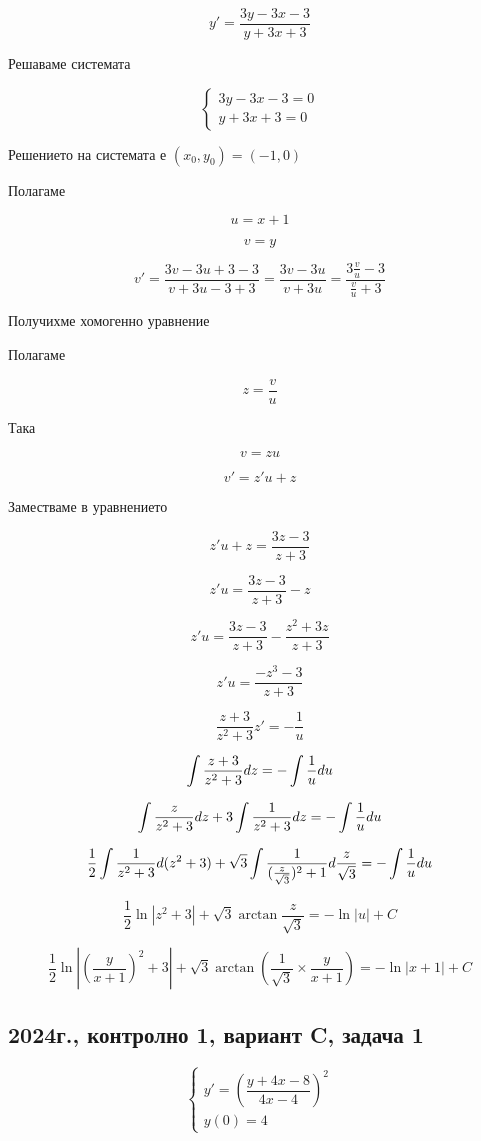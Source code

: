 \documentclass{scrartcl}
\begin{document}
$$y' = \dfrac{3y-3x-3}{y+3x+3}$$

Решаваме системата

$$
\begin{cases}
3y-3x-3=0\\
y+3x+3 = 0
\end{cases}
$$

Решението на системата е $(x_0, y_0) = (-1, 0)$

Полагаме

$$u = x+1$$

$$v = y$$

$$v' = \dfrac{3v-3u+3-3}{v+3u-3+3} = \dfrac{3v-3u}{v+3u} = \dfrac{3\frac{v}{u}-3}{\frac{v}{u}+3}$$

Получихме хомогенно уравнение

Полагаме

$$z = \dfrac{v}{u}$$

Така

$$v = zu$$

$$v' = z'u + z$$

Заместваме в уравнението

$$z'u + z = \dfrac{3z-3}{z+3}$$

$$z'u = \dfrac{3z-3}{z+3} - z$$

$$z'u = \dfrac{3z-3}{z+3} - \dfrac{z^2+3z}{z+3}$$

$$z'u = \dfrac{-z^3-3}{z+3}$$

$$\dfrac{z+3}{z^2+3}z' = -\dfrac{1}{u}$$

$$\displaystyle \int \dfrac{z+3}{z^2+3} \space dz = -\int \dfrac{1}{u} \space du$$

$$\displaystyle \int \dfrac{z}{z^2+3} \space dz + 3\int \dfrac{1}{z^2+3} \space dz = -\int \dfrac{1}{u} \space du$$

$$\displaystyle \dfrac{1}{2}\int \dfrac{1}{z^2+3} \space d(z^2+3) + \sqrt{3}\int \dfrac{1}{(\frac{z}{\sqrt{3}})^2+1} \space d\frac{z}{\sqrt{3}} = -\int \dfrac{1}{u} \space du$$

$$\dfrac{1}{2}\ln{|z^2+3|}+\sqrt{3}\arctan{\frac{z}{\sqrt{3}}}=-\ln{|u|}+C$$

$$\dfrac{1}{2}\ln{\left|\left(\frac{y}{x+1}\right)^2+3\right|}+\sqrt{3}\arctan{\left(\dfrac{1}{\sqrt{3}}\times\dfrac{y}{x+1}\right)}=-\ln{|x+1|}+C$$

\subsection{2024г., контролно 1, вариант C, задача 1}

$$
\begin{cases}
y' = \left(\dfrac{y+4x-8}{4x-4}\right)^2\\
y(0) = 4
\end{cases}
$$
\end{document}
